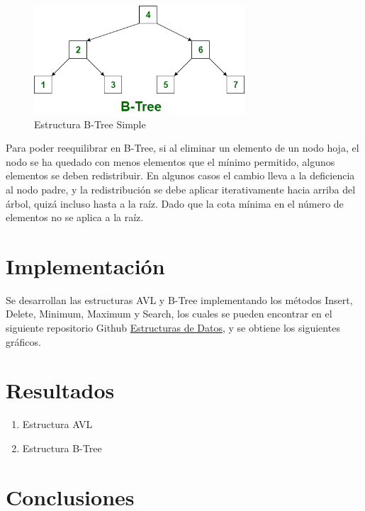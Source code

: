 \documentclass{article}
\begin{document}
\begin{enumerate}
\begin{figure}[H]
\centering
\includegraphics[width=0.7\textwidth]{Img/B-Tree.png}
\caption{Estructura B-Tree Simple}
\end{figure}

Para poder reequilibrar en B-Tree, si al eliminar un elemento de un nodo hoja, el nodo se ha quedado con menos elementos que el mínimo permitido, algunos elementos se deben redistribuir. En algunos casos el cambio lleva a la deficiencia al nodo padre, y la redistribución se debe aplicar iterativamente hacia arriba del árbol, quizá incluso hasta a la raíz. Dado que la cota mínima en el número de elementos no se aplica a la raíz. 
		 
\end{enumerate}


\section{Implementación}

  Se desarrollan las estructuras AVL y B-Tree implementando los métodos Insert, Delete, Minimum, Maximum y Search, los cuales se pueden encontrar en el siguiente repositorio Github \href{https://github.com/josuemzx/Algoritmos_de_ordenamiento-/blob/main/QuickSort.ipynb}{Estructuras de Datos}, y se obtiene los siguientes gráficos.


\section{Resultados}


    \begin{enumerate}
    
        \item Estructura AVL
        \item Estructura B-Tree
        
    \end{enumerate}

\section{Conclusiones}
\end{document}
